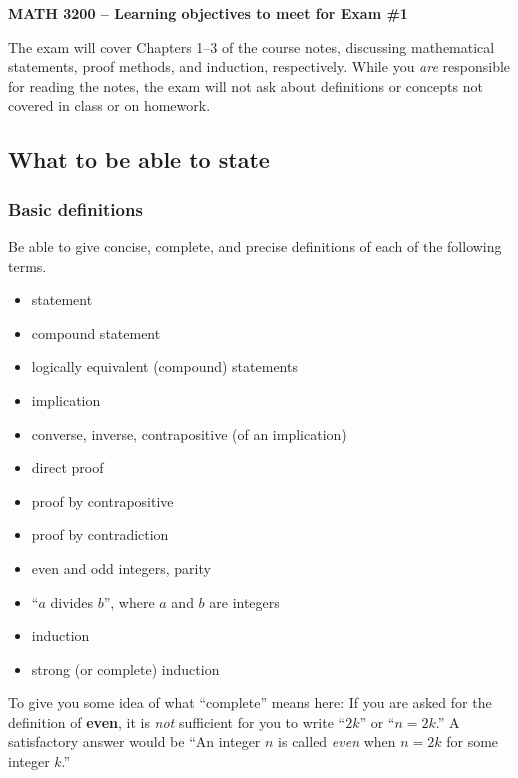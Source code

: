 \documentclass[12pt]{article}
\theoremstyle{plain}
\theoremstyle{remark}
\begin{document}
\thispagestyle{empty} \begin{center} {\textbf{MATH 3200 --
Learning objectives to meet for Exam \#1}}
\end{center}
\noindent The exam will cover Chapters 1--3 of the course notes, discussing mathematical statements, proof methods, and induction, respectively. While you \emph{are} responsible for reading the notes, the exam will not ask about definitions or concepts not covered in class or on homework.

\subsection*{What to be able to state}

\subsubsection*{Basic definitions}
Be able to give concise, complete, and precise definitions of each of the following terms.
\begin{itemize}
\item statement
\item compound statement
\item logically equivalent (compound) statements
\item implication
\item converse, inverse, contrapositive (of an implication)
\item direct proof
\item proof by contrapositive
\item proof by contradiction
\item even and odd integers, parity
\item ``$a$ divides $b$'', where $a$ and $b$ are integers
\item induction 
\item strong (or complete) induction
\end{itemize}

\noindent To give you some idea of what ``complete'' means here: If you are asked for the definition of \textbf{even}, it is \emph{not} sufficient for you to write ``$2k$'' or ``$n=2k$.'' A satisfactory answer would be ``An integer $n$ is called \emph{even} when $n=2k$ for some integer $k$.''
\end{document}
